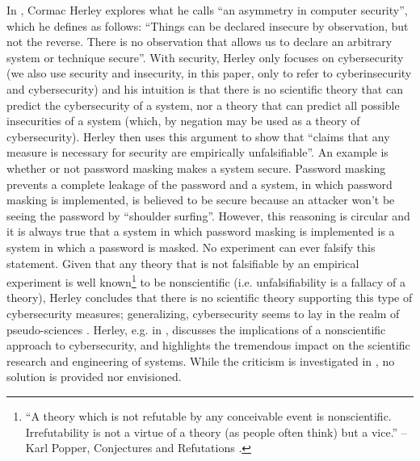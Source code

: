 \documentclass[conference]{IEEEtran}
\begin{document}
In \autocite{Herley2016unfalsifiability}, Cormac Herley explores what he calls
``an asymmetry in computer security'', which he defines as follows: ``Things
can be declared insecure by observation, but not the reverse. There is no
observation that allows us to declare an arbitrary system or technique
secure''. With security, Herley only focuses on cybersecurity (we also use
security and insecurity, in this paper, only to refer to cyberinsecurity and
cybersecurity) and his intuition is that there is no scientific theory that can
predict the cybersecurity of a system, nor a theory that can predict all
possible insecurities of a system (which, by negation may be used as a theory
of cybersecurity).  Herley then uses this argument to show that ``claims that
any measure is necessary for security are empirically unfalsifiable''. An
example is whether or not password masking makes a system secure. Password
masking prevents a complete leakage of the password and a system, in which
password masking is implemented, is believed to be secure because an attacker
won't be seeing the password by ``shoulder surfing''.  However, this reasoning
is circular and it is always true that a system in which password masking is
implemented is a system in which a password is masked. No experiment can ever
falsify this statement.  Given that any theory that is not falsifiable by an
empirical experiment is well known\footnote{``A theory which is not refutable
by any conceivable event is nonscientific. Irrefutability is not a virtue of a
theory (as people often think) but a vice.'' -- Karl Popper, Conjectures and
Refutations \autocite{popper1962conjectures}.} to be nonscientific (i.e.
unfalsifiability is a fallacy of a theory), Herley concludes that there is no
scientific theory supporting this type of cybersecurity measures; generalizing,
cybersecurity seems to lay in the realm of pseudo-sciences
\autocite{Herley2016usenixvideo}. Herley, e.g.  in
\autocite{Herley2017justifying}, discusses the implications of a nonscientific
approach to cybersecurity, and highlights the tremendous impact on the
scientific research and engineering of systems. While the criticism is
investigated in \autocite{Herley2016unfalsifiability}, no solution is provided
nor envisioned.  
\end{document}
